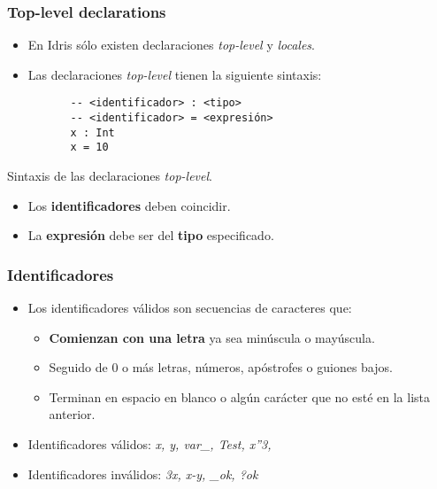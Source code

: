 \documentclass{beamer}
\begin{document}
\begin{frame}[fragile]
  \frametitle{Top-level declarations}

  \begin{itemize}
    \item En Idris sólo existen declaraciones \emph{top-level} y \emph{locales}.
    \item Las declaraciones \emph{top-level} tienen la siguiente sintaxis:
  \end{itemize}

  \begin{listing}[H]
    \begin{center}
      \begin{minipage}{0.6\textwidth}
        \begin{verbatim}
          -- <identificador> : <tipo>
          -- <identificador> = <expresión>
          x : Int
          x = 10
        \end{verbatim}
      \end{minipage}
    \end{center}
    \caption{Sintaxis de las declaraciones \emph{top-level}.}
    \label{lst:toplevelsyntax}
  \end{listing}

  \begin{itemize}
    \item Los \textbf{identificadores} deben coincidir.
    \item La \textbf{expresión} debe ser del \textbf{tipo} especificado.
  \end{itemize}

\end{frame}

\begin{frame}[fragile]
  \frametitle{Identificadores}

  \begin{itemize}
    \item Los identificadores válidos son secuencias de caracteres que:
      \begin{itemize}
        \item \textbf{Comienzan con una letra} ya sea minúscula o mayúscula.
        \item Seguido de 0 o más letras, números, apóstrofes o guiones bajos.
        \item Terminan en espacio en blanco o algún carácter que no esté
          en la lista anterior.
      \end{itemize}
    \item Identificadores válidos: \emph{x, y, var\_, Test, x''3, \alpha\xi\epsilon\lambda}
    \item Identificadores inválidos: \emph{3x, x-y, \_ok, ?ok}
  \end{itemize}

\end{frame}
\end{document}
